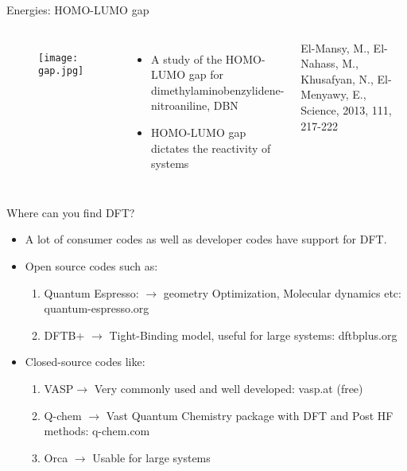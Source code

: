 \documentclass[10pt, aspectratio=169]{beamer}
\begin{document}
\begin{frame}{Energies: HOMO-LUMO gap}
\begin{columns}
    \begin{figure}
        \centering
        \texttt{[image: gap.jpg]}
        \caption*{}
        \label{fig:enter-label}
    \end{figure}
    \begin{itemize}
        \item[\dagger] A study of the HOMO-LUMO gap for dimethylaminobenzylidene-nitroaniline, DBN
        \item[\dagger] HOMO-LUMO gap dictates the reactivity of systems
    \end{itemize}
    \centering
    \vfill
    \vspace{1cm}
    \scriptsize{El-Mansy, M., El-Nahass, M., Khusafyan, N., El-Menyawy, E., Science, 2013, 111, 217-222}
    
\end{columns}
\end{frame}

\begin{frame}{Where can you find DFT?}
\begin{itemize}
    \item A lot of consumer codes as well as developer codes have support for DFT.
    \item Open source codes such as:
    \begin{enumerate}
        \item Quantum Espresso: $\rightarrow$ geometry Optimization, Molecular dynamics etc: {quantum-espresso.org}
        \item DFTB+ $\rightarrow$ Tight-Binding model, useful for large systems: dftbplus.org 
    \end{enumerate}
    \item Closed-source codes like:
    \begin{enumerate}
        \item VASP$\rightarrow$ Very commonly used and well developed: vasp.at (free)
        \item Q-chem $\rightarrow$ Vast Quantum Chemistry package with DFT and Post HF methods: q-chem.com
        \item Orca $\rightarrow$ Usable for large systems
        
    \end{enumerate}
\end{itemize}
\end{frame}
\end{document}
